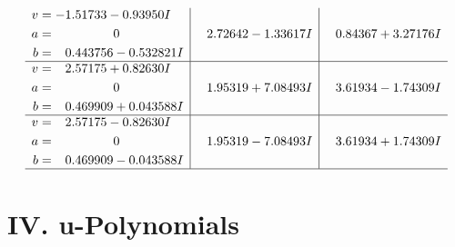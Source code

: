 \documentclass[1p]{elsarticle_modified}
\theoremstyle{definition}
\begin{document}
$$\begin{array}{c|c|c}
\begin{aligned}
v &= -1.51733 - 0.93950 I \\
a &= \phantom{-0.000000 } 0 \\
b &= \phantom{-}0.443756 - 0.532821 I\end{aligned}
 & \phantom{-}2.72642 - 1.33617 I & \phantom{-}0.84367 + 3.27176 I \\ \hline\begin{aligned}
v &= \phantom{-}2.57175 + 0.82630 I \\
a &= \phantom{-0.000000 } 0 \\
b &= \phantom{-}0.469909 + 0.043588 I\end{aligned}
 & \phantom{-}1.95319 + 7.08493 I & \phantom{-}3.61934 - 1.74309 I \\ \hline\begin{aligned}
v &= \phantom{-}2.57175 - 0.82630 I \\
a &= \phantom{-0.000000 } 0 \\
b &= \phantom{-}0.469909 - 0.043588 I\end{aligned}
 & \phantom{-}1.95319 - 7.08493 I & \phantom{-}3.61934 + 1.74309 I\\
 \hline 
 \end{array}$$\newpage
\newpage\renewcommand{\arraystretch}{1}
\centering \section*{ IV. u-Polynomials}
\end{document}
